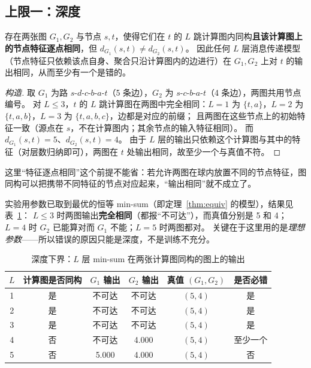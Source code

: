 \subsection{上限一：深度}\label{sec:depth}

\begin{proposition}[深度下界]\label{prop:depth}
存在两张图 $G_1,G_2$ 与节点 $s,t$，使得它们在 $t$ 的 $L$ 跳计算图内同构\textbf{且该计算图上的节点特征逐点相同}，但 $d_{G_1}(s,t)\ne d_{G_2}(s,t)$。
因此任何 $L$ 层消息传递模型（节点特征只依赖该点自身、聚合只沿计算图内的边进行）在 $G_1,G_2$ 上对 $t$ 的输出相同，从而至少有一个是错的。
\end{proposition}
\begin{proof}[构造]
取 $G_1$ 为路 $s$-$d$-$c$-$b$-$a$-$t$（5 条边），$G_2$ 为 $s$-$c$-$b$-$a$-$t$（4 条边），两图共用节点编号。
对 $L\le3$，$t$ 的 $L$ 跳计算图在两图中完全相同：$L=1$ 为 $\{t,a\}$，$L=2$ 为 $\{t,a,b\}$，$L=3$ 为 $\{t,a,b,c\}$，边都是对应的前缀；
且两图在这些节点上的初始特征一致（源点在 $s$，不在计算图内；其余节点的输入特征相同）。
而 $d_{G_1}(s,t)=5$、$d_{G_2}(s,t)=4$。
由于 $L$ 层的输出只依赖这个计算图与其中的特征（对层数归纳即可），两图在 $t$ 处输出相同，故至少一个与真值不符。
\end{proof}

这里“特征逐点相同”这个前提不能省：若允许两图在球内放置不同的节点特征，图同构可以把携带不同特征的节点对应起来，“输出相同”就不成立了。

实验用参数已取到最优的恒等 min-sum（即定理~\ref{thm:equiv} 的模型），结果见表~\ref{tab:depth}：
$L\le3$ 时两图输出\textbf{完全相同}（都报“不可达”），而真值分别是 5 和 4；$L=4$ 时 $G_2$ 已能算对而 $G_1$ 不能；$L=5$ 时两图都对。
关键在于这里用的是\emph{理想参数}——所以错误的原因只能是深度，不是训练不充分。

\begin{table}[H]
\centering
\caption{深度下界：$L$ 层 min-sum 在两张计算图同构的图上的输出}
\label{tab:depth}
\begin{tabular}{cccccc}
\toprule
$L$ & 计算图是否同构 & $G_1$ 输出 & $G_2$ 输出 & 真值 $(G_1,G_2)$ & 是否必错 \\
\midrule
1 & 是 & 不可达 & 不可达 & $(5,4)$ & 是 \\
2 & 是 & 不可达 & 不可达 & $(5,4)$ & 是 \\
3 & 是 & 不可达 & 不可达 & $(5,4)$ & 是 \\
4 & 否 & 不可达 & 4.000 & $(5,4)$ & 至少一个 \\
5 & 否 & 5.000 & 4.000 & $(5,4)$ & 否 \\
\bottomrule
\end{tabular}
\end{table}

